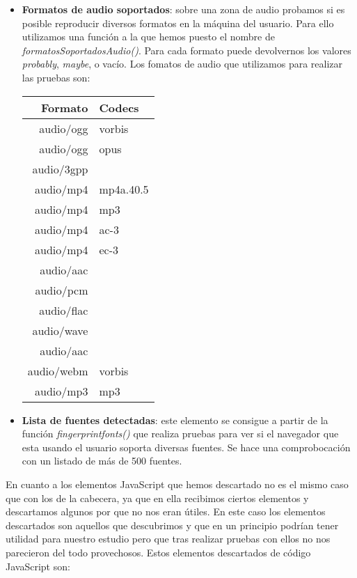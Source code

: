 \begin{itemize}
\begin{table}[H]
    \end{table}
    \item \textbf{Formatos de audio soportados}: sobre una zona de audio probamos si es posible reproducir diversos formatos en la máquina del usuario. Para ello utilizamos una función a la que hemos puesto el nombre de \textit{formatosSoportadosAudio()}. Para cada formato puede devolvernos los valores \textit{probably}, \textit{maybe}, o vacío. Los fomatos de audio que utilizamos para realizar las pruebas son:
    \begin{table}[H]
        \begin{center}
            \begin{tabular}{ r | l }
            \textbf{Formato} & \textbf{Codecs} \\ \hline
            audio/ogg & vorbis \\
            audio/ogg & opus \\
            audio/3gpp \\
            audio/mp4 & mp4a.40.5 \\
            audio/mp4 & mp3 \\
            audio/mp4 & ac-3 \\
            audio/mp4 & ec-3 \\
            audio/aac \\
            audio/pcm \\
            audio/flac \\
            audio/wave \\
            audio/aac \\
            audio/webm & vorbis \\
            audio/mp3 & mp3 \\
            \end{tabular}
        \end{center}
    \end{table}
    \item \textbf{Lista de fuentes detectadas}: este elemento se consigue a partir de la función \textit{fingerprintfonts()} que realiza pruebas para ver si el navegador que esta usando el usuario soporta diversas fuentes. Se hace una comprobocación con un listado de más de 500 fuentes.
\end{itemize}
En cuanto a los elementos JavaScript que hemos descartado no es el mismo caso que con los de la cabecera, ya que en ella recibimos ciertos elementos y descartamos algunos por que no nos eran útiles. En este caso los elementos descartados son aquellos que descubrimos y que en un principio podrían tener utilidad para nuestro estudio pero que tras realizar pruebas con ellos no nos parecieron del todo provechosos. Estos elementos descartados de código JavaScript son:
